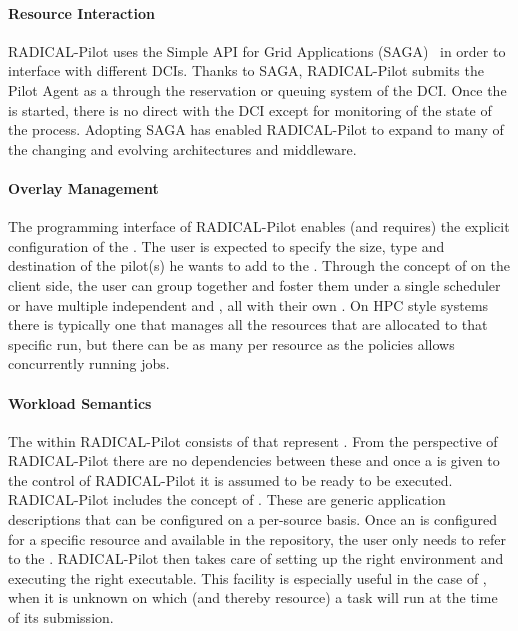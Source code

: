 \documentclass{sig-alternate}
\begin{document}
\paragraph{Resource Interaction}

RADICAL-Pilot uses the Simple API for Grid Applications
(SAGA)~\cite{ogf-gfd-90, sagastuff} in order to interface with different DCIs.
Thanks to SAGA, RADICAL-Pilot submits the Pilot Agent as a  through
the reservation or queuing system of the DCI. Once the  is
started, there is no direct  with the DCI except for
monitoring of the state of the  process. Adopting SAGA has
enabled RADICAL-Pilot to expand to many of the changing and evolving
architectures and middleware.

\paragraph{Overlay Management}

The programming interface of RADICAL-Pilot enables (and requires) the explicit
configuration of the . The user is expected to specify the size,
type and destination of the pilot(s) he wants to add to the .
Through the concept of  on the client side, the user can
group \pilots together and foster them under a single scheduler or have
multiple independent  and \pilots, all with their own
. On HPC style systems there is typically one \pilot that
manages all the resources that are allocated to that specific run, but there
can be as many \pilots per resource as the policies allows concurrently running
jobs.

\paragraph{Workload Semantics}

The  within RADICAL-Pilot consists of 
that represent . From the perspective of RADICAL-Pilot there are
no dependencies between these  and once a
 is given to the control of RADICAL-Pilot it is assumed to
be ready to be executed. RADICAL-Pilot includes the concept of . These are generic application descriptions that can be
configured on a per-source basis. Once an  is
configured for a specific resource and available in the repository, the user
only needs to refer to the . RADICAL-Pilot then
takes care of setting up the right environment and executing the right
executable. This facility is especially useful in the case of
, when it is unknown on which \pilot (and thereby resource)
a task will run at the time of its submission.
\end{document}
